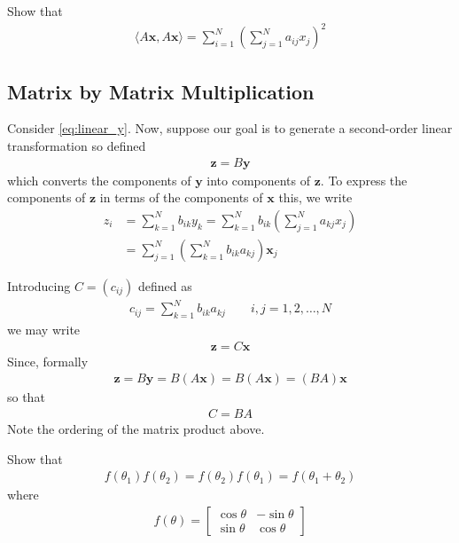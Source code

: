 \begin{homework}
	Show that 
	\begin{align}
		\langle A \bm{x}, A \bm{x} \rangle = \sum_{i=1}^{N} \left(\sum_{j=1}^{N} a_{ij}x_j\right)^2
	\end{align}
\end{homework}

\subsection{Matrix by Matrix Multiplication}

Consider \eqref{eq:linear_y}. Now, suppose our goal is to generate a second-order linear transformation so defined 
%
\begin{align}
	\bm{z} = B\bm{y}
\end{align}
%
which converts the components of $\bm{y}$ into components of $\bm{z}$. To express the components of $\bm{z}$ in terms of the components of $\bm{x}$ this, we write
%
\begin{align}
	z_i &= \sum_{k=1}^{N} b_{ik} y_k = \sum_{k=1}^{N} b_{ik} \left(\sum_{j=1}^{N}a_{kj}x_j\right) \\
	&= \sum_{j=1}^{N} \left(\sum_{k=1}^{N}b_{ik}a_{kj}\right)\bm{x}_j
\end{align}

Introducing $C=\left(c_{ij}\right)$ defined as 
%
\begin{align}
	c_{ij} = \sum_{k=1}^{N} b_{ik} a_{kj} \qquad i,j = 1,2,\ldots,N
\end{align}
%
we may write 
%
\begin{align}
	\bm{z} = C \bm{x}
\end{align}
%
Since, formally
%
\begin{align}
	\bm{z} = B\bm{y} = B(A\bm{x}) = B(A\bm{x}) = (BA) \bm{x}
\end{align}
%
so that 
%
\begin{align}
	C = BA
\end{align}
%
Note the ordering of the matrix product above.
%
\begin{homework}
	Show that 
	\begin{align}
		f(\theta_1) f(\theta_2) = f(\theta_2) f(\theta_1) = f(\theta_1 + \theta_2)
	\end{align}
	where 
	\begin{align}
		f(\theta) = \begin{bmatrix}
		\cos \theta & -\sin \theta \\
		\sin  \theta & \cos \theta
		\end{bmatrix}
	\end{align}
\end{homework}

